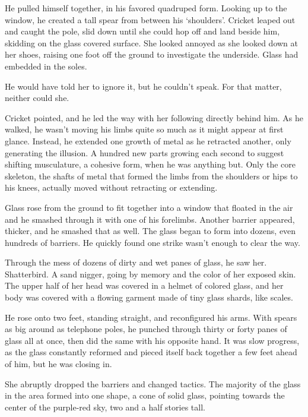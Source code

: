 He pulled himself together, in his favored quadruped form.  Looking up to the window, he created a tall spear from between his `shoulders'.  Cricket leaped out and caught the pole, slid down until she could hop off and land beside him, skidding on the glass covered surface.  She looked annoyed as she looked down at her shoes, raising one foot off the ground to investigate the underside.  Glass had embedded in the soles.



He would have told her to ignore it, but he couldn't speak.  For that matter, neither could she.



Cricket pointed, and he led the way with her following directly behind him.  As he walked, he wasn't moving his limbs quite so much as it might appear at first glance.  Instead, he extended one growth of metal as he retracted another, only generating the illusion.  A hundred new parts growing each second to suggest shifting musculature, a cohesive form, when he was anything but.  Only the core skeleton, the shafts of metal that formed the limbs from the shoulders or hips to his knees,  actually moved without retracting or extending.



Glass rose from the ground to fit together into a window that floated in the air and he smashed through it with one of his forelimbs.  Another barrier appeared, thicker, and he smashed that as well.  The glass began to form into dozens, even hundreds of barriers.  He quickly found one strike wasn't enough to clear the way.



Through the mess of dozens of dirty and wet panes of glass, he saw her.  Shatterbird.  A sand nigger, going by memory and the color of her exposed skin.  The upper half of her head was covered in a helmet of colored glass, and her body was covered with a flowing garment made of tiny glass shards, like scales.



He rose onto two feet, standing straight, and reconfigured his arms.  With spears as big around as telephone poles, he punched through thirty or forty panes of glass all at once, then did the same with his opposite hand.  It was slow progress, as the glass constantly reformed and pieced itself back together a few feet ahead of him, but he was closing in.



She abruptly dropped the barriers and changed tactics.  The majority of the glass in the area formed into one shape, a cone of solid glass, pointing towards the center of the purple-red sky, two and a half stories tall.



